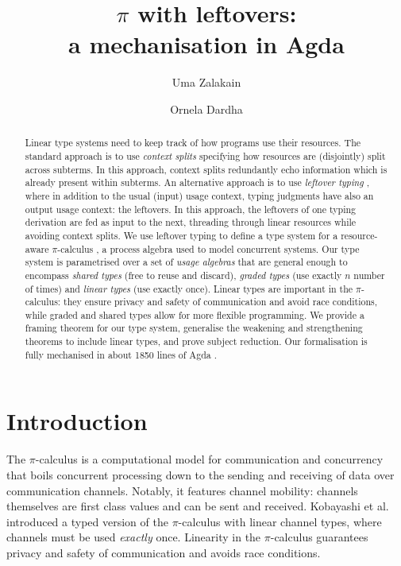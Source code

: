 \documentclass[runningheads]{llncs}
\title{$\pi$ with leftovers: \\ a mechanisation in Agda}
\author{
  Uma Zalakain\inst{1}\orcidID{0000-0002-3268-9338}
  \and
  Ornela Dardha\inst{2}\orcidID{0000-0001-9927-7875}
}
\institute{
  University of Glasgow, Scotland \ \ \email{u.zalakain.1@research.gla.ac.uk}
  \and
  University of Glasgow, Scotland \ \ \email{ornela.dardha@glasgow.ac.uk}
}
\newcommand{\picalc}{$\pi$-calculus}
\begin{document}
\maketitle

\begin{abstract}
  Linear type systems need to keep track of how programs use their resources.
  The standard approach is to use \emph{context splits} specifying how resources are (disjointly) split across subterms.
  In this approach, context splits redundantly echo information which is already present within subterms.  An alternative approach is to use \emph{leftover typing} \cite{Mackie,Allais2018a}, where in addition to the usual (input) usage context, typing judgments have also an output usage context: the leftovers.
  In this approach, the leftovers of one typing derivation are fed as input to the next, threading through linear resources while avoiding context splits.
  We use leftover typing to define a type system for a {resource-aware \picalc{}} \cite{MilnerPW92,Milner99}, a process algebra used to  model concurrent systems.
  Our type system is parametrised over a set of \emph{usage algebras} that are general enough to encompass \emph{shared types} (free to reuse and discard), \emph{graded types} (use exactly $n$ number of times) and \emph{linear types} (use exactly once).
   Linear types are important in the \picalc{}: they ensure privacy and safety of communication and avoid race conditions, while graded and shared types allow for more flexible programming.
  We provide a framing theorem for our type system, generalise the weakening and strengthening theorems to include linear types, and prove subject reduction.
  Our formalisation is fully mechanised in about 1850 lines of Agda \cite{Zalakain2020Agda}.

\end{abstract}

\section{Introduction}

The \picalc{} \cite{MilnerPW92,Milner99} is a computational model for communication and concurrency that boils concurrent processing down to the sending and receiving of data over communication channels.
Notably, it features channel mobility: channels themselves are first class values and can be sent and received.
Kobayashi et al. \cite{KPT96} introduced a typed version of the \picalc{} with linear channel types, where channels must be used \emph{exactly} once.
Linearity in the \picalc{} guarantees privacy and safety of communication and avoids race conditions.
\end{document}
